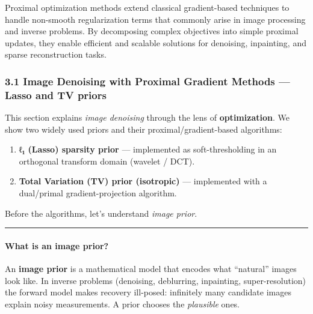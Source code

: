 \documentclass[11pt]{article}
\providecommand{\tightlist}{%
      \setlength{\itemsep}{0pt}\setlength{\parskip}{0pt}}
\begin{document}
Proximal optimization methods extend classical gradient-based techniques
to handle non-smooth regularization terms that commonly arise in image
processing and inverse problems. By decomposing complex objectives into
simple proximal updates, they enable efficient and scalable solutions
for denoising, inpainting, and sparse reconstruction tasks.

\hypertarget{image-denoising-with-proximal-gradient-methods-lasso-and-tv-priors}{%
\subsubsection{\texorpdfstring{\textbf{3.1 Image Denoising with Proximal
Gradient Methods --- Lasso and TV
priors}}{3.1 Image Denoising with Proximal Gradient Methods --- Lasso and TV priors}}\label{image-denoising-with-proximal-gradient-methods-lasso-and-tv-priors}}

This section explains \emph{image denoising} through the lens of
\textbf{optimization}. We show two widely used priors and their
proximal/gradient-based algorithms:

\begin{enumerate}
\def\labelenumi{\arabic{enumi}.}
\tightlist
\item
  \textbf{ℓ₁ (Lasso) sparsity prior} --- implemented as
  soft-thresholding in an orthogonal transform domain (wavelet / DCT).
\item
  \textbf{Total Variation (TV) prior (isotropic)} --- implemented with a
  dual/primal gradient-projection algorithm.
\end{enumerate}

Before the algorithms, let's understand \emph{image prior}.

\begin{center}\rule{0.5\linewidth}{0.5pt}\end{center}

\hypertarget{what-is-an-image-prior}{%
\paragraph{\texorpdfstring{\textbf{What is an image
prior}?}{What is an image prior?}}\label{what-is-an-image-prior}}

An \textbf{image prior} is a mathematical model that encodes what
``natural'' images look like. In inverse problems (denoising,
deblurring, inpainting, super-resolution) the forward model makes
recovery ill-posed: infinitely many candidate images explain noisy
measurements. A prior chooses the \emph{plausible} ones.
\end{document}
